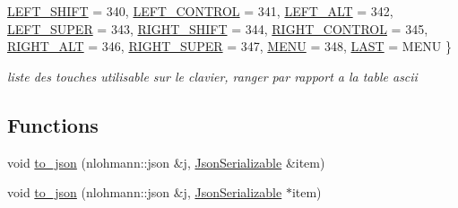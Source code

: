 \begin{DoxyCompactItemize}
\newline
\mbox{\hyperlink{namespace_beer_engine_a94f0b552f6dc910de8cdb44207981f53a03da566b2b9336b400b4705fb30ec353}{L\+E\+F\+T\+\_\+\+S\+H\+I\+FT}} = 340, 
\mbox{\hyperlink{namespace_beer_engine_a94f0b552f6dc910de8cdb44207981f53aa72bd0e5107a4a5be1eaeabee33ccd1d}{L\+E\+F\+T\+\_\+\+C\+O\+N\+T\+R\+OL}} = 341, 
\mbox{\hyperlink{namespace_beer_engine_a94f0b552f6dc910de8cdb44207981f53ad0e87cb8e4b0f51a2273174570da8a84}{L\+E\+F\+T\+\_\+\+A\+LT}} = 342, 
\mbox{\hyperlink{namespace_beer_engine_a94f0b552f6dc910de8cdb44207981f53a230f24bf89b20b0e50dc1a8a0a6f81cc}{L\+E\+F\+T\+\_\+\+S\+U\+P\+ER}} = 343, 
\newline
\mbox{\hyperlink{namespace_beer_engine_a94f0b552f6dc910de8cdb44207981f53a271add76ebbb8339e051fcd87451043f}{R\+I\+G\+H\+T\+\_\+\+S\+H\+I\+FT}} = 344, 
\mbox{\hyperlink{namespace_beer_engine_a94f0b552f6dc910de8cdb44207981f53a7c0afa9a234cf58b47baaede6409cd32}{R\+I\+G\+H\+T\+\_\+\+C\+O\+N\+T\+R\+OL}} = 345, 
\mbox{\hyperlink{namespace_beer_engine_a94f0b552f6dc910de8cdb44207981f53a6ba472f1d572073cf08d3cc17d2e9c17}{R\+I\+G\+H\+T\+\_\+\+A\+LT}} = 346, 
\mbox{\hyperlink{namespace_beer_engine_a94f0b552f6dc910de8cdb44207981f53a8af008c322d87c9b3c4233685511b098}{R\+I\+G\+H\+T\+\_\+\+S\+U\+P\+ER}} = 347, 
\newline
\mbox{\hyperlink{namespace_beer_engine_a94f0b552f6dc910de8cdb44207981f53aa686ee02a4631c1a999aab37581c755a}{M\+E\+NU}} = 348, 
\mbox{\hyperlink{namespace_beer_engine_a94f0b552f6dc910de8cdb44207981f53a29a701d97a66423b0c2b058dae0a1bbf}{L\+A\+ST}} = M\+E\+NU
 \}
\begin{DoxyCompactList}\small\item\em liste des touches utilisable sur le clavier, ranger par rapport a la table ascii \end{DoxyCompactList}\end{DoxyCompactItemize}
\subsection*{Functions}
\begin{DoxyCompactItemize}
\item 
void \mbox{\hyperlink{namespace_beer_engine_ac7bfb3583343140927a57aee0082276f}{to\+\_\+json}} (nlohmann\+::json \&j, \mbox{\hyperlink{class_beer_engine_1_1_json_serializable}{Json\+Serializable}} \&item)
\item 
void \mbox{\hyperlink{namespace_beer_engine_adda2b4038b06099373d181ef4d3baed0}{to\+\_\+json}} (nlohmann\+::json \&j, \mbox{\hyperlink{class_beer_engine_1_1_json_serializable}{Json\+Serializable}} $\ast$item)
\end{DoxyCompactItemize}


